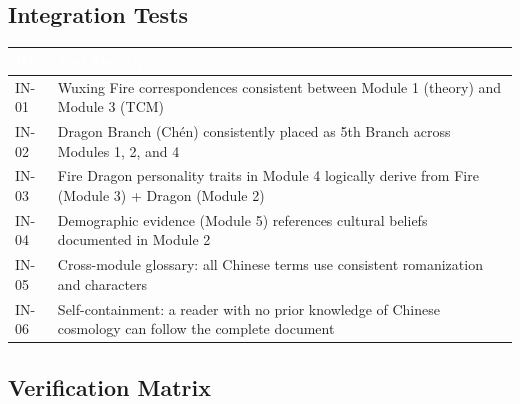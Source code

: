 \documentclass[11pt,letterpaper]{article}
\newcommand{\tableheader}[1]{\textbf{\sffamily\textcolor{white}{#1}}}
\begin{document}
\subsection{Integration Tests}

\begin{center}
\begin{tabularx}{\textwidth}{C{1.2cm}X}
\toprule
{}
\tableheader{ID} & \tableheader{Test Description} \\
\midrule
IN-01 & Wuxing Fire correspondences consistent between Module 1 (theory) and Module 3 (TCM) \\
IN-02 & Dragon Branch (Chén) consistently placed as 5th Branch across Modules 1, 2, and 4 \\
IN-03 & Fire Dragon personality traits in Module 4 logically derive from Fire (Module 3) + Dragon (Module 2) \\
IN-04 & Demographic evidence (Module 5) references cultural beliefs documented in Module 2 \\
IN-05 & Cross-module glossary: all Chinese terms use consistent romanization and characters \\
IN-06 & Self-containment: a reader with no prior knowledge of Chinese cosmology can follow the complete document \\
\bottomrule
\end{tabularx}
\end{center}

\subsection{Verification Matrix}
\end{document}
